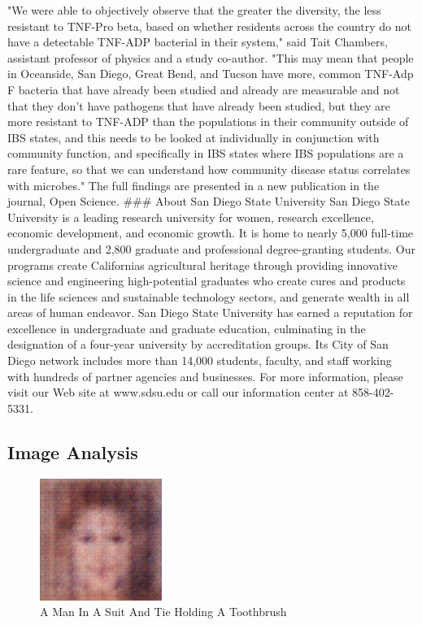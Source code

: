 \documentclass{article}%
\begin{document}
"We were able to objectively observe that the greater the diversity, the less resistant to TNF{-}Pro beta, based on whether residents across the country do not have a detectable TNF{-}ADP bacterial in their system," said Tait Chambers, assistant professor of physics and a study co{-}author. "This may mean that people in Oceanside, San Diego, Great Bend, and Tucson have more, common TNF{-}Adp F bacteria that have already been studied and already are measurable and not that they don't have pathogens that have already been studied, but they are more resistant to TNF{-}ADP than the populations in their community outside of IBS states, and this needs to be looked at individually in conjunction with community function, and specifically in IBS states where IBS populations are a rare feature, so that we can understand how community disease status correlates with microbes."\newline%
The full findings are presented in a new publication in the journal, Open Science.\newline%
\#\#\#\newline%
About San Diego State University\newline%
San Diego State University is a leading research university for women, research excellence, economic development, and economic growth. It is home to nearly 5,000 full{-}time undergraduate and 2,800 graduate and professional degree{-}granting students. Our programs create Californias agricultural heritage through providing innovative science and engineering high{-}potential graduates who create cures and products in the life sciences and sustainable technology sectors, and generate wealth in all areas of human endeavor. San Diego State University has earned a reputation for excellence in undergraduate and graduate education, culminating in the designation of a four{-}year university by accreditation groups. Its City of San Diego network includes more than 14,000 students, faculty, and staff working with hundreds of partner agencies and businesses. For more information, please visit our Web site at www.sdsu.edu or call our information center at 858{-}402{-}5331.

%
\subsection{Image Analysis}%
\label{subsec:ImageAnalysis}%


\begin{figure}[h!]%
\centering%
\includegraphics[width=150px]{500_fake_images/samples_5_103.png}%
\caption{A Man In A Suit And Tie Holding A Toothbrush}%
\end{figure}

%
\end{document}
